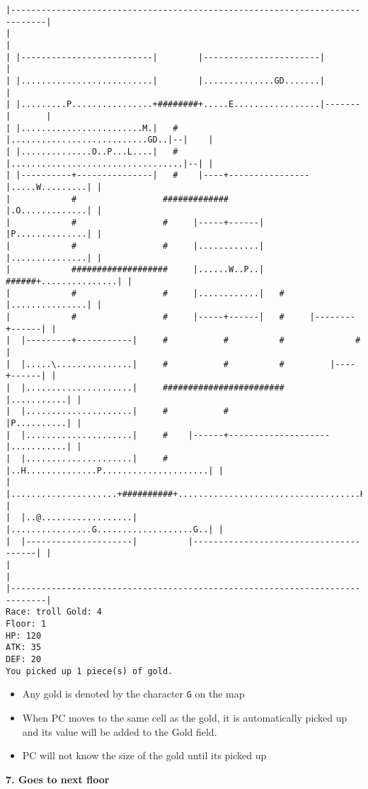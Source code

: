 \documentclass[11pt]{article}
\theoremstyle{plain}
\begin{document}
\begin{Verbatim}[fontsize=\scriptsize]
|-----------------------------------------------------------------------------|
|                                                                             |
| |--------------------------|        |-----------------------|               |
| |..........................|        |..............GD.......|               |
| |.........P................+########+.....E.................|-------|       |
| |........................M.|   #    |...........................GD..|--|    |
| |..............O..P...L....|   #    |..................................|--| |
| |----------+---------------|   #    |----+----------------|.....W.........| |
|            #                 #############                |.O.............| |
|            #                 #     |-----+------|         |P..............| |
|            #                 #     |............|         |...............| |
|            ###################     |......W..P..|   ######+...............| |
|            #                 #     |............|   #     |...............| |
|            #                 #     |-----+------|   #     |--------+------| |
|  |---------+-----------|     #           #          #              #        |
|  |.....\...............|     #           #          #         |----+------| |
|  |.....................|     ########################         |...........| |
|  |.....................|     #           #                    |P..........| |
|  |.....................|     #    |------+--------------------|...........| |
|  |.....................|     #    |..H..............P.....................| |
|  |.....................+##########+....................................H..| |
|  |..@..................|          |................G...................G..| |
|  |---------------------|          |---------------------------------------| |
|                                                                             |
|-----------------------------------------------------------------------------|
Race: troll Gold: 4                                                    Floor: 1
HP: 120
ATK: 35
DEF: 20
You picked up 1 piece(s) of gold. 
\end{Verbatim}

\begin{itemize}
    \item Any gold is denoted by the character \texttt{G} on the map
    \item When PC moves to the same cell as the gold, it is automatically picked up
          and its value will be added to the Gold field.
    \item PC will not know the size of the gold until its picked up
\end{itemize}
\textbf{7. Goes to next floor}
\end{document}
